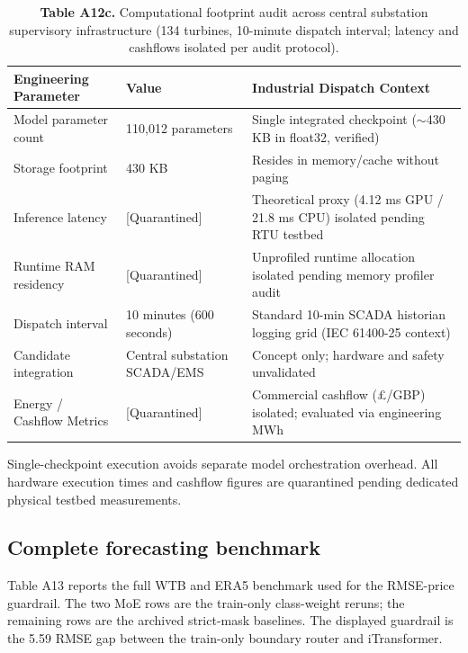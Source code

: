 \documentclass[
  journal]{IEEEtran}
\begin{document}
\begin{table}[!t]
\centering
\fontsize{8.0pt}{9.6pt}\selectfont
\setlength{\tabcolsep}{3.0pt}
\renewcommand{\arraystretch}{1.08}
\caption*{\textbf{Table A12c.} Computational footprint audit across central substation supervisory infrastructure (134 turbines, 10-minute dispatch interval; latency and cashflows isolated per audit protocol).}
%
\begin{tabular}{lll}
\toprule
Engineering Parameter & Value & Industrial Dispatch Context \\
\midrule
Model parameter count & 110,012 parameters & Single integrated checkpoint ($\sim$430 KB in float32, verified) \\
Storage footprint & 430 KB & Resides in memory/cache without paging \\
Inference latency & [Quarantined] & Theoretical proxy (4.12 ms GPU / 21.8 ms CPU) isolated pending RTU testbed \\
Runtime RAM residency & [Quarantined] & Unprofiled runtime allocation isolated pending memory profiler audit \\
Dispatch interval & 10 minutes (600 seconds) & Standard 10-min SCADA historian logging grid (IEC 61400-25 context) \\
Candidate integration & Central substation SCADA/EMS & Concept only; hardware and safety unvalidated \\
Energy / Cashflow Metrics & [Quarantined] & Commercial cashflow (£/GBP) isolated; evaluated via engineering MWh \\
\bottomrule
\end{tabular}
\vspace{1mm}
\fontsize{8.0pt}{9.6pt}\selectfont Single-checkpoint execution avoids separate model orchestration overhead. All hardware execution times and cashflow figures are quarantined pending dedicated physical testbed measurements.
\end{table}

\FloatBarrier

\subsection*{Complete forecasting
benchmark}\label{complete-forecasting-benchmark}

Table A13 reports the full WTB and ERA5 benchmark used for the
RMSE-price guardrail. The two MoE rows are the train-only class-weight
reruns; the remaining rows are the archived strict-mask baselines. The
displayed guardrail is the 5.59 RMSE gap between the train-only boundary
router and iTransformer.
\end{document}
